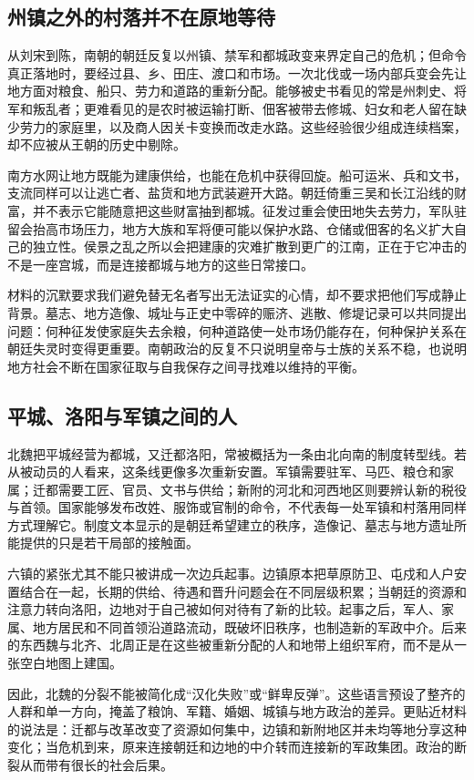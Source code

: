 \subsection{州镇之外的村落并不在原地等待}

从刘宋到陈，南朝的朝廷反复以州镇、禁军和都城政变来界定自己的危机；但命令真正落地时，要经过县、乡、田庄、渡口和市场。一次北伐或一场内部兵变会先让地方面对粮食、船只、劳力和道路的重新分配。能够被史书看见的常是州刺史、将军和叛乱者；更难看见的是农时被运输打断、佃客被带去修城、妇女和老人留在缺少劳力的家庭里，以及商人因关卡变换而改走水路。这些经验很少组成连续档案，却不应被从王朝的历史中剔除。

南方水网让地方既能为建康供给，也能在危机中获得回旋。船可运米、兵和文书，支流同样可以让逃亡者、盐货和地方武装避开大路。朝廷倚重三吴和长江沿线的财富，并不表示它能随意把这些财富抽到都城。征发过重会使田地失去劳力，军队驻留会抬高市场压力，地方大族和军将便可能以保护水路、仓储或佃客的名义扩大自己的独立性。侯景之乱之所以会把建康的灾难扩散到更广的江南，正在于它冲击的不是一座宫城，而是连接都城与地方的这些日常接口。

材料的沉默要求我们避免替无名者写出无法证实的心情，却不要求把他们写成静止背景。墓志、地方造像、城址与正史中零碎的赈济、逃散、修堤记录可以共同提出问题：何种征发使家庭失去余粮，何种道路使一处市场仍能存在，何种保护关系在朝廷失灵时变得更重要。南朝政治的反复不只说明皇帝与士族的关系不稳，也说明地方社会不断在国家征取与自我保存之间寻找难以维持的平衡。

\subsection{平城、洛阳与军镇之间的人}

北魏把平城经营为都城，又迁都洛阳，常被概括为一条由北向南的制度转型线。若从被动员的人看来，这条线更像多次重新安置。军镇需要驻军、马匹、粮仓和家属；迁都需要工匠、官员、文书与供给；新附的河北和河西地区则要辨认新的税役与首领。国家能够发布改姓、服饰或官制的命令，不代表每一处军镇和村落用同样方式理解它。制度文本显示的是朝廷希望建立的秩序，造像记、墓志与地方遗址所能提供的只是若干局部的接触面。

六镇的紧张尤其不能只被讲成一次边兵起事。边镇原本把草原防卫、屯戍和人户安置结合在一起，长期的供给、待遇和晋升问题会在不同层级积累；当朝廷的资源和注意力转向洛阳，边地对于自己被如何对待有了新的比较。起事之后，军人、家属、地方居民和不同首领沿道路流动，既破坏旧秩序，也制造新的军政中介。后来的东西魏与北齐、北周正是在这些被重新分配的人和地带上组织军府，而不是从一张空白地图上建国。

因此，北魏的分裂不能被简化成“汉化失败”或“鲜卑反弹”。这些语言预设了整齐的人群和单一方向，掩盖了粮饷、军籍、婚姻、城镇与地方政治的差异。更贴近材料的说法是：迁都与改革改变了资源如何集中，边镇和新附地区并未均等地分享这种变化；当危机到来，原来连接朝廷和边地的中介转而连接新的军政集团。政治的断裂从而带有很长的社会后果。

